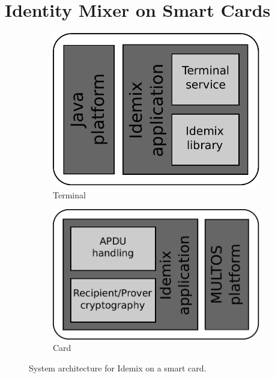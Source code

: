 \section{Identity Mixer on Smart Cards}

\begin{figure}[h]
  \centering
  \begin{subfigure}{0.45\textwidth}
    \includegraphics[scale=.45]{images/idemix-terminal-architecture}
    \caption{Terminal}
    \label{fig:terminal-architecture}
  \end{subfigure}
  \qquad
  \begin{subfigure}{0.45\textwidth}
    \includegraphics[scale=.45]{images/idemix-card-architecture}
    \caption{Card}
    \label{fig:card-architecture}
  \end{subfigure}
  \caption{System architecture for Idemix on a smart card.}
  \label{fig:architecture}
\end{figure}

